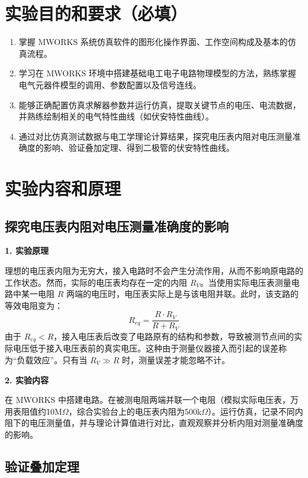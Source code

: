 ﻿\documentclass[10.5pt]{config}
\date{}
\begin{document}
\makeheader %

\section{实验目的和要求（必填）}

\begin{enumerate}[label=\arabic*., leftmargin=2em]
    \item 掌握 MWORKS 系统仿真软件的图形化操作界面、工作空间构成及基本的仿真流程。
    \item 学习在 MWORKS 环境中搭建基础电工电子电路物理模型的方法，熟练掌握电气元器件模型的调用、参数配置以及信号连线。
    \item 能够正确配置仿真求解器参数并运行仿真，提取关键节点的电压、电流数据，并熟练绘制相关的电气特性曲线（如伏安特性曲线）。
    \item 通过对比仿真测试数据与电工学理论计算结果，探究电压表内阻对电压测量准确度的影响、验证叠加定理、得到二极管的伏安特性曲线。
\end{enumerate}

\section{实验内容和原理}


\subsection{探究电压表内阻对电压测量准确度的影响}

\textbf{1. 实验原理}

理想的电压表内阻为无穷大，接入电路时不会产生分流作用，从而不影响原电路的工作状态。然而，实际的电压表均存在一定的内阻 $R_V$。当使用实际电压表测量电路中某一电阻 $R$ 两端的电压时，电压表实际上是与该电阻并联。此时，该支路的等效电阻变为：
$$R_{eq} = \frac{R \cdot R_V}{R + R_V}$$
由于 $R_{eq} < R$，接入电压表后改变了电路原有的结构和参数，导致被测节点间的实际电压低于接入电压表前的真实电压。这种由于测量仪器接入而引起的误差称为“负载效应”。只有当 $R_V \gg R$ 时，测量误差才能忽略不计。

\textbf{2. 实验内容}

在 MWORKS 中搭建电路。在被测电阻两端并联一个电阻（模拟实际电压表，万用表阻值约10M$\Omega$，综合实验台上的电压表内阻为500k$\Omega$）。运行仿真，记录不同内阻下的电压测量值，并与理论计算值进行对比，直观观察并分析内阻对测量准确度的影响。

\subsection{验证叠加定理}
\end{document}
